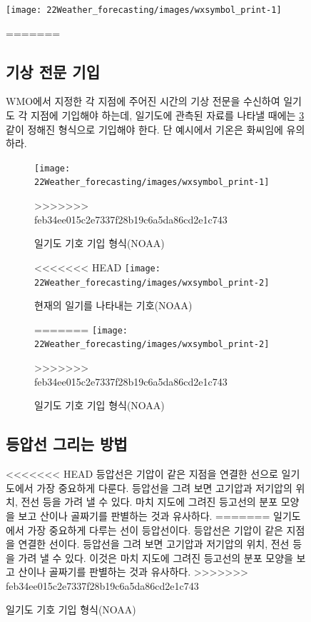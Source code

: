 \begin{figure}[p]
	\centering
	\texttt{[image: 22Weather\_forecasting/images/wxsymbol\_print-1]}
	\caption{일기도 기호 기입 설명(NOAA)}
=======
\subsection{기상 전문 기입}

WMO에서 지정한 각 지점에 주어진 시간의 기상 전문을 수신하여 일기도 각 지점에 기입해야 하는데, 일기도에 관측된 자료를 나타낼 때에는 \ref{fig:drawsymbols-1}\과 같이 정해진 형식으로 기입해야 한다. 단 예시에서 기온은 화씨임에 유의하라.

\begin{figure}[p]
	\centering
	\texttt{[image: 22Weather\_forecasting/images/wxsymbol\_print-1]}
	\caption{일기도 기호 기입 형식(NOAA)}
>>>>>>> feb34ee015c2e7337f28b19c6a5da86cd2e1c743
	\label{fig:drawsymbols-1}
\end{figure}

\begin{figure}[p]
	\centering
<<<<<<< HEAD
	\texttt{[image: 22Weather\_forecasting/images/wxsymbol\_print-2]}
	\caption{현재의 일기를 나타내는 기호(NOAA)}
	\label{fig:drawsymbols-2}
=======
	\texttt{[image: 22Weather\_forecasting/images/wxsymbol\_print-2]}
	\caption{일기도 기호 기입 형식(NOAA)}
	\label{fig:drawsymbols-1}
>>>>>>> feb34ee015c2e7337f28b19c6a5da86cd2e1c743
\end{figure}


\newpage
\subsection{등압선 그리는 방법}
<<<<<<< HEAD
등압선은 기압이 같은 지점을 연결한 선으로 일기도에서 가장 중요하게 다룬다. 등압선을 그려 보면 고기압과 저기압의 위치, 전선 등을 가려 낼 수 있다. 마치 지도에 그려진 등고선의 분포 모양을 보고 산이나 골짜기를 판별하는 것과 유사하다. 
=======
일기도에서 가장 중요하게 다루는 선이 등압선이다. 등압선은 기압이 같은 지점을 연결한 선이다. 등압선을 그려 보면 고기압과 저기압의 위치, 전선 등을 가려 낼 수 있다. 이것은 마치 지도에 그려진 등고선의 분포 모양을 보고 산이나 골짜기를 판별하는 것과 유사하다. 
>>>>>>> feb34ee015c2e7337f28b19c6a5da86cd2e1c743


\end{figure}
